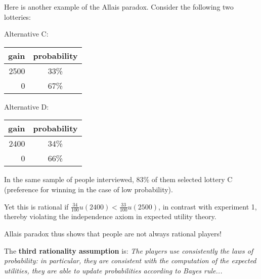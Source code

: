 \documentclass[../main.tex]{subfiles}
\begin{document}
\begin{example}
    Here is another example of the Allais paradox. Consider the following two lotteries:

    Alternative C:
    \begin{center}
        \begin{tabular}{|r|c|}
            \hline
            gain & probability \\\hline
            2500 & 33\%        \\\hline
            0    & 67\%        \\\hline
        \end{tabular}
    \end{center}
    Alternative D:
    \begin{center}
        \begin{tabular}{|r|c|}
            \hline
            gain & probability \\\hline
            2400 & 34\%        \\\hline
            0    & 66\%        \\\hline
        \end{tabular}
    \end{center}
    In the same sample of people interviewed, 83\% of them selected lottery C (preference for winning in the case of low probability).

    Yet this is rational if $\frac{34}{100} u(2400) < \frac{33}{100} u(2500)$, in contrast with experiment 1, thereby violating the independence axiom in expected utility theory.

    Allais paradox thus shows that people are not always rational players!
\end{example}

The \textbf{third rationality assumption} is: \textit{The players use consistently the laws of probability: in particular, they are consistent with the computation of the expected utilities, they are able to update probabilities according to Bayes rule...}
\end{document}

